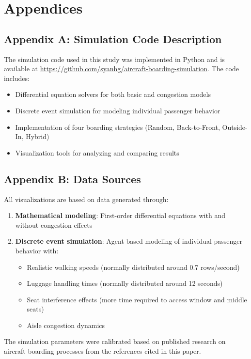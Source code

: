 \documentclass[12pt,a4paper]{article}
\begin{document}
\section{Appendices}

\subsection{Appendix A: Simulation Code Description}
The simulation code used in this study was implemented in Python and is available at \url{https://github.com/syanhg/aircraft-boarding-simulation}. The code includes:

\begin{itemize}
    \item Differential equation solvers for both basic and congestion models
    \item Discrete event simulation for modeling individual passenger behavior
    \item Implementation of four boarding strategies (Random, Back-to-Front, Outside-In, Hybrid)
    \item Visualization tools for analyzing and comparing results
\end{itemize}

\subsection{Appendix B: Data Sources}
All visualizations are based on data generated through:

\begin{enumerate}
    \item \textbf{Mathematical modeling}: First-order differential equations with and without congestion effects
    \item \textbf{Discrete event simulation}: Agent-based modeling of individual passenger behavior with:
    \begin{itemize}
        \item Realistic walking speeds (normally distributed around 0.7 rows/second)
        \item Luggage handling times (normally distributed around 12 seconds)
        \item Seat interference effects (more time required to access window and middle seats)
        \item Aisle congestion dynamics
    \end{itemize}
\end{enumerate}

The simulation parameters were calibrated based on published research on aircraft boarding processes from the references cited in this paper.
\end{document}
